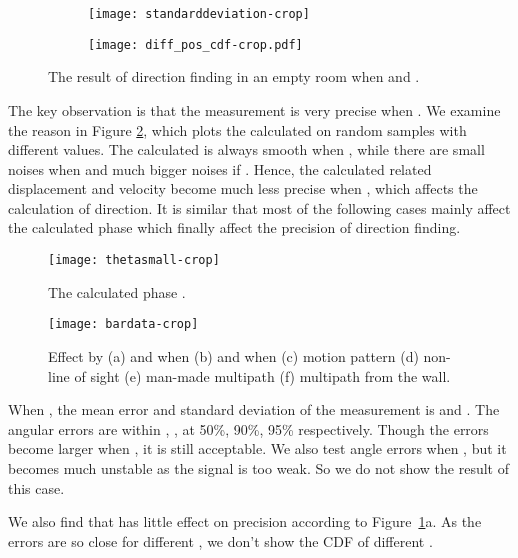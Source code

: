 \documentclass[]{sig-alternate-10pt}
\begin{document}
\begin{figure}[h]
\begin{subfigure}[b]{0.235\textwidth}
\texttt{[image: standarddeviation-crop]}
\end{subfigure}
\begin{subfigure}[b]{0.2\textwidth}
\texttt{[image: diff\_pos\_cdf-crop.pdf]}
\end{subfigure}
    \caption{The result of direction finding in an empty room when  and .}
    \label{fig:initresult}
\end{figure}



The key observation is that the measurement is very precise when
.  We examine the
reason in Figure \ref{fig:phasemeter}, which plots the calculated
 on random samples with different  values. The calculated
 is always smooth when , while there are
small noises when  and much bigger noises if
. Hence, the calculated related displacement and velocity
become much less precise when , which affects the
calculation of direction. It is similar that most of the following
cases mainly affect the calculated phase which finally affect the
precision of direction finding.

\begin{figure}[h]
    \begin{center}
        \texttt{[image: thetasmall-crop]}
    \end{center}
    \caption{The calculated phase .}
    \label{fig:phasemeter}
\end{figure}

\begin{figure*}[htpb]
    \begin{center}
        \texttt{[image: bardata-crop]}
    \end{center}
    \caption{Effect by (a)  and  when 
      (b)  and  when  (c) motion
      pattern (d) non-line of sight (e) man-made multipath (f)
      multipath from the wall.}
    \label{fig:errorerror}
\end{figure*}
When , the mean error and standard
deviation of the measurement is  and . The angular
errors are within , ,  at  50\%,
90\%, 95\% respectively. Though the errors become larger when
, it is still acceptable. We also test angle
errors when , but it becomes much unstable as the signal is
too weak. So we do not show the result of this case.

We also find that   has little effect on precision according
to Figure~\ref{fig:initresult}a.  As the errors are so close for
different , we don't show the CDF of different .
\end{document}

